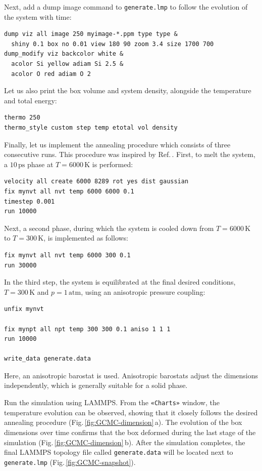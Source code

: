 \documentclass[9pt,tutorial]{livecoms}
\newcommand{\lmpcmd}[1]{\hspace{0pt}\colorbox{listing}{\textcolor{command}{\small{#1}}}\hspace{0pt}} %
\newcommand{\flecmd}[1]{\textcolor{command}{\texttt{#1}}} %
\newcommand{\guicmd}[1]{\textcolor{command}{\texttt{«#1»}}} %
\begin{document}
Next, add a \lmpcmd{dump image} command to \flecmd{generate.lmp} to follow the
evolution of the system with time:
\begin{lstlisting}
dump viz all image 250 myimage-*.ppm type type &
  shiny 0.1 box no 0.01 view 180 90 zoom 3.4 size 1700 700
dump_modify viz backcolor white &
  acolor Si yellow adiam Si 2.5 &
  acolor O red adiam O 2
\end{lstlisting}
Let us also print the box volume and system density, alongside the
temperature and total energy:
\begin{lstlisting}
thermo 250
thermo_style custom step temp etotal vol density 
\end{lstlisting}

Finally, let us implement the annealing procedure which
consists of three consecutive runs.  This procedure was inspired
by Ref.\,\cite{della1992molecular}.  First, to melt the system,
a $10\,\text{ps}$ phase at $T = 6000\,\text{K}$ is performed:
\begin{lstlisting}
velocity all create 6000 8289 rot yes dist gaussian
fix mynvt all nvt temp 6000 6000 0.1
timestep 0.001
run 10000
\end{lstlisting}
Next, a second phase, during which the system is cooled down from $T = 6000\,\text{K}$
to $T = 300\,\text{K}$, is implemented as follows:
\begin{lstlisting}
fix mynvt all nvt temp 6000 300 0.1
run 30000
\end{lstlisting}
In the third step, the system is equilibrated at the final desired
conditions, $T = 300\,\text{K}$ and $p = 1\,\text{atm}$, 
using an anisotropic pressure coupling:
\begin{lstlisting}
unfix mynvt

fix mynpt all npt temp 300 300 0.1 aniso 1 1 1
run 10000

write_data generate.data
\end{lstlisting}
Here, an anisotropic barostat is used.
Anisotropic barostats adjust the dimensions independently, which is
generally suitable for a solid phase.

Run the simulation using LAMMPS.  From the \guicmd{Charts} window, the temperature
evolution can be observed, showing that it closely follows the desired annealing procedure (Fig.\,\ref{fig:GCMC-dimension}\,a).
The evolution of the box dimensions over time confirms that the box
deformed during the last stage of the simulation
(Fig.\,\ref{fig:GCMC-dimension}\,b).  After the simulation completes, the final
LAMMPS topology file called \flecmd{generate.data}
will be located next to \flecmd{generate.lmp} (Fig.\,\ref{fig:GCMC-snapshot}).
\end{document}
